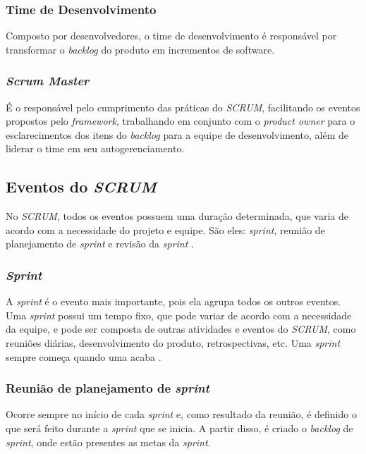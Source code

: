 \subsubsection{Time de Desenvolvimento}
Composto por desenvolvedores, o time de desenvolvimento é responsável por transformar o \textit{backlog} do produto em incrementos de software.

\subsubsection{\textit{Scrum Master}}
É o responsável pelo cumprimento das práticas do \textit{SCRUM}, facilitando os eventos propostos pelo \textit{framework}, trabalhando em conjunto com o \textit{product owner} para o esclarecimentos dos itens do \textit{backlog} para a equipe de desenvolvimento, além de liderar o time em seu autogerenciamento.

\subsection{Eventos do \textit{SCRUM}}

No \textit{SCRUM}, todos os eventos possuem uma duração determinada, que varia de acordo com a necessidade do projeto e equipe. São eles: \textit{sprint}, reunião de planejamento de \textit{sprint} e revisão da \textit{sprint} \cite{sutherland2013}.

\subsubsection{\textit{Sprint}}
A \textit{sprint} é o evento mais importante, pois ela agrupa todos os outros eventos. Uma \textit{sprint} possui um tempo fixo, que pode variar de acordo com a necessidade da equipe, e pode ser composta de outras atividades e eventos do \textit{SCRUM}, como reuniões diárias, desenvolvimento do produto, retrospectivas, etc. Uma \textit{sprint} sempre começa quando uma acaba \cite{sutherland2013}.

\subsubsection{Reunião de planejamento de \textit{sprint}}
Ocorre sempre no início de cada \textit{sprint} e, como resultado da reunião, é definido o que será feito durante a \textit{sprint} que se inicia. A partir disso, é criado o \textit{backlog} de \textit{sprint}, onde estão presentes as metas da \textit{sprint}.

